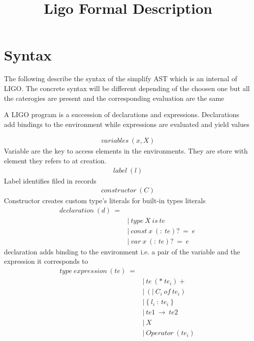 \documentclass[10pt,a4paper]{article}
\title{Ligo Formal Description}
\author{}
\date{}
\begin{document}
\maketitle
\section*{ Syntax }
The following describe the syntax of the simplify AST which is an internal of LIGO. The concrete syntax will be different depending of the choosen one but all the caterogies are present and the corresponding evaluation are the same

A LIGO program is a succession of declarations and expressions. Declarations add bindings to the environment while expressions are evaluated and yield values

\begin{align*}
variables\ (x,X)
\end{align*}
Variable are the key to access elements in the environments. They are store with element they refers to at creation.
\begin{align*}
label\ (l)
\end{align*}
Label identifies filed in records 
\begin{align*}
constructor\ (C)
\end{align*}
Constructor creates custom type's literals for built-in types literals
\begin{align*}
declaration\ (d)\ = 
\\
 \ &|\ type \ X\ is\ te                    \ \tag{Type\ variable\ declaration}
\\
 \ &|\ const\ x\ (:\ te)?\ =\ e              \ \tag{Term\ Constant\ variable\ declaration}
\\
 \ &|\ var  \ x\ (:\ te)?\ =\ e              \ \tag{Term\ Mutable\ variable\ declaration}
\end{align*}
declaration adds binding to the environment i.e. a pair of the variable and the expression it corresponds to
\begin{align*}
type\ expression\ (te)\ =
\\
 \ &|\ te\ (*\ te_i)+                    \ \tag{type\ of\ tuple}
\\
 \ &|\ (|\ C_i\ of\ te_i)                 \ \tag{type\ of\ sum}
\\
 \ &|\ \{\ l_i\ :\ te_i\ \}                  \ \tag{type\ of\ record}
\\
 \ &|\ te1\ \rightarrow \ te2                      \ \tag{type\ of\ function}
\\
 \ &|\ X                               \ \tag{type\ variable}
\\
 \ &|\ Operator\ (te_i)                 \ \tag{built\ in\ function\ on\ type}
\end{align*}
\end{document}
